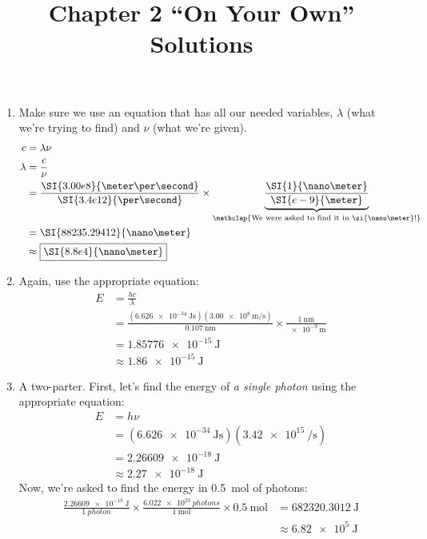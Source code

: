 \documentclass[11pt,letterpaper]{article}
\title{Chapter 2 ``On Your Own'' Solutions}
\begin{document}
\begin{center}
	\bfseries
	\Large
	\thetitle
\end{center}

\begin{enumerate}
	\item Make sure we use an equation that has all our needed variables,
		$\lambda$ (what we're trying to find) and $\nu$ (what we're
		given).
		\begin{align*}
			c &= \lambda \nu \\
			\lambda &= \frac{c}{\nu} \\
			&=
			\frac{\SI{3.00e8}{\meter\per\second}}{\SI{3.4e12}{\per\second}} 
			\times
			\underbrace{\frac{\SI{1}{\nano\meter}}{\SI{e-9}{\meter}}}_{\mathclap{\text{We
						were asked to find it in
			\si{\nano\meter}!}}} \\
			&= \SI{88235.29412}{\nano\meter} \\
			&\approx \boxed{\SI{8.8e4}{\nano\meter}}
		\end{align*}
	\item Again, use the appropriate equation:
		\begin{align*}
			E &= \frac{hc}{\lambda} \\
			&= \frac{(\SI{6.626e-34}{\joule\second})
			(\SI{3.00e8}{\meter\per\second})}{\SI{0.107}{\nano\meter}}
			\times \frac{\SI{1}{\nano\meter}}{\SI{e-9}{\meter}} \\
			&= \SI{1.85776e-15}{\joule} \\
			&\approx \boxed{\SI{1.86e-15}{\joule}}
		\end{align*}
	\item A two-parter. First, let's find the energy of \emph{a single
		photon} using the appropriate equation:
		\begin{align*}
			E &= h\nu \\
			  &=
			  (\SI{6.626e-34}{\joule\second})(\SI{3.42e15}{\per\second})
			  \\
			  &= \SI{2.26609e-18}{\joule} \\
			  &\approx \boxed{\SI{2.27e-18}{\joule}}
		  \end{align*}
		Now, we're asked to find the energy in \SI{0.5}{\mole} of
		photons:
		\begin{align*}
			  \frac{\SI{2.26609e-18}{\joule}}{\SI{1}{photon}} \times
			  \frac{\SI{6.022e23}{photons}}{\SI{1}{\mole}} \times
			  \SI{0.5}{\mole} &=
			  \SI{682320.3012}{\joule} \\
			  &\approx \boxed{\SI{6.82e5}{\joule}}
		  \end{align*}

\end{enumerate}
\end{document}
